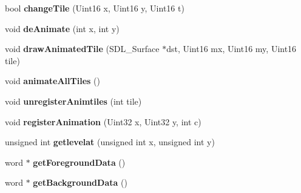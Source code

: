 \begin{DoxyCompactItemize}
\item 
\hypertarget{class_c_map_a642baffa60bb9ed901462bd7b6a3de16}{
bool {\bfseries changeTile} (Uint16 x, Uint16 y, Uint16 t)}
\label{class_c_map_a642baffa60bb9ed901462bd7b6a3de16}

\item 
\hypertarget{class_c_map_a2b1898413ae1f58cfacb89d9db231ad3}{
void {\bfseries deAnimate} (int x, int y)}
\label{class_c_map_a2b1898413ae1f58cfacb89d9db231ad3}

\item 
\hypertarget{class_c_map_a7f6cbfcb33cc1411eb044b65e9e36bd7}{
void {\bfseries drawAnimatedTile} (SDL\_\-Surface $\ast$dst, Uint16 mx, Uint16 my, Uint16 tile)}
\label{class_c_map_a7f6cbfcb33cc1411eb044b65e9e36bd7}

\item 
\hypertarget{class_c_map_a77541c5c500571846519c86305c43954}{
void {\bfseries animateAllTiles} ()}
\label{class_c_map_a77541c5c500571846519c86305c43954}

\item 
\hypertarget{class_c_map_a4401d23b0b0c2ee2316fb79350c0233e}{
void {\bfseries unregisterAnimtiles} (int tile)}
\label{class_c_map_a4401d23b0b0c2ee2316fb79350c0233e}

\item 
\hypertarget{class_c_map_aea0165a6fe2a202b81dbe7876a36b261}{
void {\bfseries registerAnimation} (Uint32 x, Uint32 y, int c)}
\label{class_c_map_aea0165a6fe2a202b81dbe7876a36b261}

\item 
\hypertarget{class_c_map_a56c898e8d20b0eaf467517d65ed16b8c}{
unsigned int {\bfseries getlevelat} (unsigned int x, unsigned int y)}
\label{class_c_map_a56c898e8d20b0eaf467517d65ed16b8c}

\item 
\hypertarget{class_c_map_a5b95f7aa02b48513e1866c850f192798}{
word $\ast$ {\bfseries getForegroundData} ()}
\label{class_c_map_a5b95f7aa02b48513e1866c850f192798}

\item 
\hypertarget{class_c_map_a8eaaa63b4a54e80cfc5eb333fb5dea73}{
word $\ast$ {\bfseries getBackgroundData} ()}
\label{class_c_map_a8eaaa63b4a54e80cfc5eb333fb5dea73}

\end{DoxyCompactItemize}
